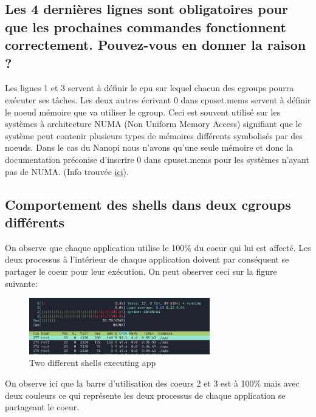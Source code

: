 \documentclass{ReportTemplate}
\begin{document}
\subsection{Les 4 dernières lignes sont obligatoires pour que les prochaines commandes fonctionnent correctement. Pouvez-vous en donner la raison ?}
Les lignes 1 et 3 servent à définir le cpu sur lequel chacun des cgroups pourra
exécuter ses tâches. Les deux autres écrivant 0 dans cpuset.mems servent à
définir le noeud mémoire que va utiliser le cgroup. Ceci est souvent utilisé sur
les systèmes à architecture NUMA (Non Uniform Memory Access) signifiant que le
système peut contenir plusieurs types de mémoires différents symbolisés par des
noeuds. Dans le cas du Nanopi nous n'avons qu'une seule mémoire et donc la
documentation préconise d'inscrire 0 dans cpuset.mems pour les systèmes n'ayant
pas de NUMA. (Info trouvée \href{https://docs.oracle.com/cd/E37670_01/E37355/html/ol_cpuset_cgroups.html#:~:text=mems%20changes.,the%20node%20list%20where%20possible.}{ici}). 
\newpage
\subsection{Comportement des shells dans deux cgroups différents}
On observe que chaque application utilise le 100\% du coeur qui lui est affecté.
Les deux processus à l'intérieur de chaque application doivent par conséquent se
partager le coeur pour leur exécution. On peut observer ceci sur la figure
suivante:
\begin{figure}[H]
    \centering
    \includegraphics[width=0.7\textwidth]{imageSources/LowHigh_Groups.png}
    \caption{Two different shells executing app}
    \label{fig:LowHighGroup}
\end{figure}
On observe ici que la barre d'utilisation des coeurs 2 et 3 est à 100\% mais
avec deux couleurs ce qui représente les deux processus de chaque application se
partageant le coeur.
\end{document}
